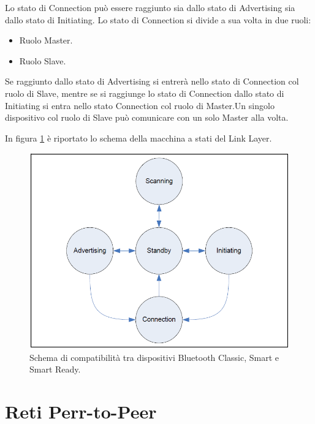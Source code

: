 Lo stato di Connection può essere raggiunto sia dallo stato di Advertising sia dallo stato di Initiating. Lo stato di Connection si divide a sua volta in due ruoli:
\begin{itemize}
	\item Ruolo Master.
	\item Ruolo Slave.
\end{itemize}
Se raggiunto dallo stato di Advertising si entrerà nello stato di Connection col ruolo di Slave, mentre se si raggiunge lo stato di Connection dallo stato di Initiating si entra nello stato Connection col ruolo di Master.Un singolo dispositivo col ruolo di Slave può comunicare con un solo Master alla volta.
 
In figura \ref{fig:bt_fsa} è riportato lo schema della macchina a stati del Link Layer.
\begin{figure}[t]
	\centering
	\includegraphics[width=0.9\linewidth, keepaspectratio]{Images/bt/bt_fsa}
	\caption[Schema di compatibilità.]{Schema di compatibilità tra dispositivi Bluetooth Classic, Smart e Smart Ready.}
	\label{fig:bt_fsa}
\end{figure}

\section{Reti Perr-to-Peer}

